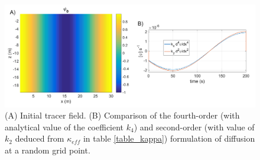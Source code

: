 \begin{figure}[h!]
\centering
\includegraphics[width=1\textwidth]{./CHAP_BPE/AGBPE_numlab5.png}
\caption{(A) Initial tracer field. (B) Comparison of the fourth-order (with analytical value of the coefficient $k_4$) and second-order (with value of $k_2$ deduced from $\kappa_{eff}$ in table \ref{table_kappa}) formulation of diffusion at a random grid point.}
\label{fig5numlab}
\end{figure}

